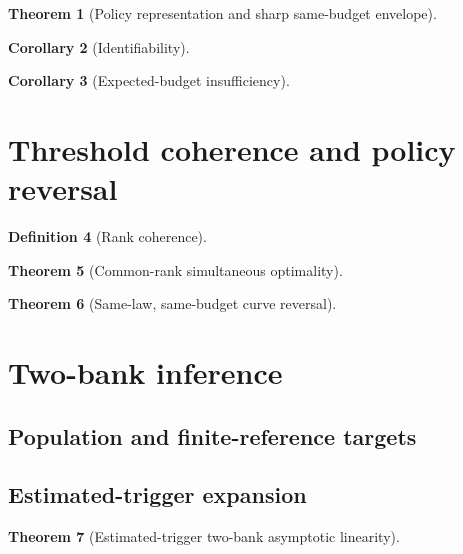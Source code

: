 \documentclass[11pt]{article}
\newtheorem{theorem}{Theorem}
\newtheorem{corollary}[theorem]{Corollary}
\theoremstyle{definition}
\newtheorem{definition}[theorem]{Definition}
\theoremstyle{remark}
\begin{document}
\begin{theorem}[Policy representation and sharp same-budget envelope]
\end{theorem}

\begin{corollary}[Identifiability]
\end{corollary}

\begin{corollary}[Expected-budget insufficiency]
\end{corollary}

\section{Threshold coherence and policy reversal}
\begin{definition}[Rank coherence]
\end{definition}

\begin{theorem}[Common-rank simultaneous optimality]
\end{theorem}

\begin{theorem}[Same-law, same-budget curve reversal]
\end{theorem}

\section{Two-bank inference}
\subsection{Population and finite-reference targets}

\subsection{Estimated-trigger expansion}
\begin{theorem}[Estimated-trigger two-bank asymptotic linearity]
\end{theorem}
\end{document}
